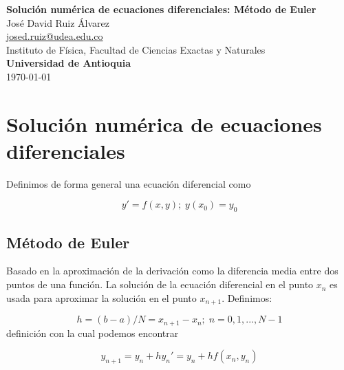 \documentclass[10.5pt]{article}
\begin{document}
\noindent
\begin{minipage}[b]{0.75\linewidth}
{\LARGE\bf Solución numérica de ecuaciones diferenciales: Método de Euler}\\ %
\large{Jos\'{e} David Ruiz \'{A}lvarez} \\
\small{\href{mailto:josed.ruiz@udea.edu.co}{josed.ruiz@udea.edu.co}} \\ %
\normalsize{Instituto de Física, Facultad de Ciencias Exactas y Naturales} \\%
\normalsize{\bf Universidad de Antioquia} \\[8mm]
\today %
\end{minipage}%




\section{Solución numérica de ecuaciones diferenciales}

Definimos de forma general una ecuación diferencial como

\begin{equation}
y'=f(x,y);\; y(x_{0})=y_{0}
\end{equation}

\subsection{Método de Euler}

Basado en la aproximación de la derivación como la diferencia media entre dos puntos de una función. La solución de la ecuación diferencial en el punto $x_{n}$ es usada para aproximar la solución en el punto $x_{n+1}$. Definimos:

\begin{equation}
h=(b-a)/N=x_{n+1}-x_{n};\; n=0,1,...,N-1
\end{equation} definición con la cual podemos encontrar 

\begin{equation}
y_{n+1}=y_{n}+hy_{n}'=y_{n}+hf(x_{n},y_{n})
\end{equation}
\end{document}
